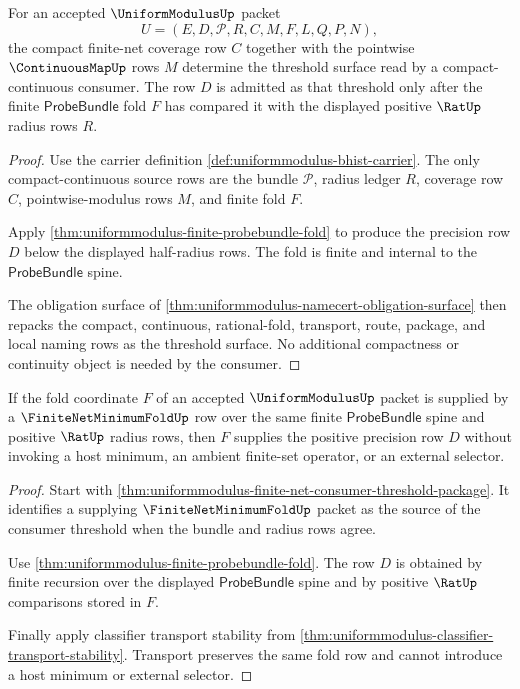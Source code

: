 \begin{theorem}
\label{thm:uniformmodulus-root-compact-continuous-threshold}
For an accepted $\UniformModulusUp$ packet
$$
U=(E,D,\mathcal{P},R,C,M,F,L,Q,P,N),
$$
the compact finite-net coverage row $C$ together with the pointwise
$\ContinuousMapUp$ rows $M$ determine the threshold surface read by a
compact-continuous consumer. The row $D$ is admitted as that threshold only
after the finite $\mathsf{ProbeBundle}$ fold $F$ has compared it with the
displayed positive $\RatUp$ radius rows $R$.
\end{theorem}
\begin{proof}
Use the carrier definition \autoref{def:uniformmodulus-bhist-carrier}. The only
compact-continuous source rows are the bundle $\mathcal{P}$, radius ledger $R$,
coverage row $C$, pointwise-modulus rows $M$, and finite fold $F$.

Apply \autoref{thm:uniformmodulus-finite-probebundle-fold} to produce the
precision row $D$ below the displayed half-radius rows. The fold is finite and
internal to the $\mathsf{ProbeBundle}$ spine.

The obligation surface of
\autoref{thm:uniformmodulus-namecert-obligation-surface} then repacks the
compact, continuous, rational-fold, transport, route, package, and local naming
rows as the threshold surface. No additional compactness or continuity object is
needed by the consumer.
\end{proof}

\begin{theorem}
\label{thm:uniformmodulus-root-net-minimum-row}
If the fold coordinate $F$ of an accepted $\UniformModulusUp$ packet is supplied
by a $\FiniteNetMinimumFoldUp$ row over the same finite $\mathsf{ProbeBundle}$
spine and positive $\RatUp$ radius rows, then $F$ supplies the positive
precision row $D$ without invoking a host minimum, an ambient finite-set
operator, or an external selector.
\end{theorem}
\begin{proof}
Start with \autoref{thm:uniformmodulus-finite-net-consumer-threshold-package}.
It identifies a supplying $\FiniteNetMinimumFoldUp$ packet as the source of the
consumer threshold when the bundle and radius rows agree.

Use \autoref{thm:uniformmodulus-finite-probebundle-fold}. The row $D$ is
obtained by finite recursion over the displayed $\mathsf{ProbeBundle}$ spine
and by positive $\RatUp$ comparisons stored in $F$.

Finally apply classifier transport stability from
\autoref{thm:uniformmodulus-classifier-transport-stability}. Transport preserves
the same fold row and cannot introduce a host minimum or external selector.
\end{proof}

